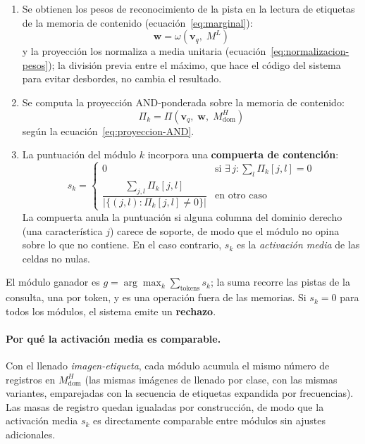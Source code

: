 \begin{enumerate}
    \item Se obtienen los pesos de reconocimiento de la pista en la lectura de etiquetas de la
    memoria de contenido (ecuación~\eqref{eq:marginal}):
    \begin{equation}
        \mathbf{w} = \omega(\mathbf{v}_q,\; M^L)
        \label{eq:pesos-routing}
    \end{equation}
    y la proyección los normaliza a media unitaria (ecuación~\eqref{eq:normalizacion-pesos});
    la división previa entre el máximo, que hace el código del sistema para evitar
    desbordes, no cambia el resultado.

    \item Se computa la proyección AND-ponderada sobre la memoria de contenido:
    \begin{equation}
        \Pi_k = \Pi(\mathbf{v}_q,\; \mathbf{w},\; M^H_{\mathrm{dom}})
        \label{eq:proyeccion-routing}
    \end{equation}
    según la ecuación~\eqref{eq:proyeccion-AND}.

    \item La puntuación del módulo $k$ incorpora una \textbf{compuerta de contención}:
    \begin{equation}
        s_k = \begin{cases}
            0 & \text{si } \exists\, j : \sum_l \Pi_k[j, l] = 0 \\[4pt]
            \dfrac{\displaystyle\sum_{j,l} \Pi_k[j, l]}%
                  {|\{(j,l) : \Pi_k[j,l] \neq 0\}|} & \text{en otro caso}
        \end{cases}
        \label{eq:score-gated}
    \end{equation}
    La compuerta anula la puntuación si alguna columna del dominio derecho (una
    característica $j$) carece de soporte, de modo que el módulo no opina sobre lo que no
    contiene.
    En el caso contrario, $s_k$ es la \emph{activación media} de las celdas no nulas.
\end{enumerate}

El módulo ganador es $g = \arg\max_k \sum_{\text{tokens}} s_k$; la suma recorre las
pistas de la consulta, una por token, y es una operación fuera de las memorias.
Si $s_k = 0$ para todos los módulos, el sistema emite un \textbf{rechazo}.

\paragraph{Por qué la activación media es comparable.}
Con el llenado \emph{imagen-etiqueta}, cada módulo acumula el mismo número de registros
en $M^H_{\mathrm{dom}}$ (las mismas imágenes de llenado por clase, con las mismas
variantes, emparejadas con la secuencia de etiquetas expandida por frecuencias).
Las masas de registro quedan igualadas por construcción, de modo que la activación media
$s_k$ es directamente comparable entre módulos sin ajustes adicionales.

